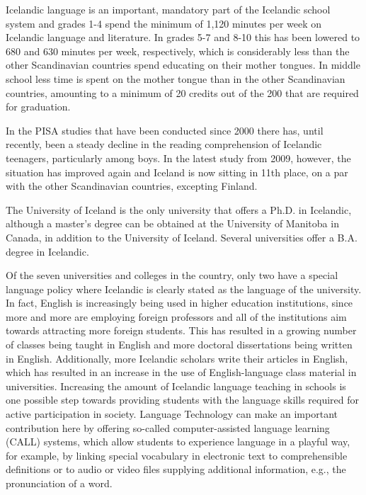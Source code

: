 \documentclass{../../metanetpaper}
\begin{document}
\begin{multicols}{2}
Icelandic language is an important, mandatory part of the Icelandic school system and grades 1-4 spend the minimum of 1,120 minutes per week on Icelandic language and literature. In grades 5-7 and 8-10 this has been lowered to 680 and 630 minutes per week, respectively, which is considerably less than the other Scandinavian countries spend educating on their mother tongues\cite{men2}.  In middle school less time is spent on the mother tongue than in the other Scandinavian countries, amounting to a minimum of 20 credits out of the 200 that are required for graduation.\cite{men3}

In the PISA studies that have been conducted since 2000 there has, until recently, been a steady decline in the reading comprehension of Icelandic teenagers, particularly among boys. In the latest study from 2009, however, the situation has improved again and Iceland is now sitting in 11th place, on a par with the other Scandinavian countries, excepting Finland\cite{nam1}. 

The University of Iceland is the only university that offers a Ph.D. in Icelandic, although a master’s degree can be obtained at the University of Manitoba in Canada, in addition to the University of Iceland. Several universities offer a B.A. degree in Icelandic.

Of the seven universities and colleges in the country, only two have a special language policy where Icelandic is clearly stated as the language of the university. In fact, English is increasingly being used in higher education institutions, since more and more are employing foreign professors and all of the institutions aim towards attracting more foreign students. This has resulted in a growing number of classes being taught in English and more doctoral dissertations being written in English. Additionally, more Icelandic scholars write their articles in English, which has resulted in an increase in the use of English-language class material in universities\cite{isl1}. 
Increasing the amount of Icelandic language teaching in schools is one possible step towards providing students with the language skills required for active participation in society. Language Technology can make an important contribution here by offering so-called computer-assisted language learning (CALL) systems, which allow students to experience language in a playful way, for example, by linking special vocabulary in electronic text to comprehensible definitions or to audio or video files supplying additional information, e.g., the pronunciation of a word.


\end{multicols}
\end{document}
